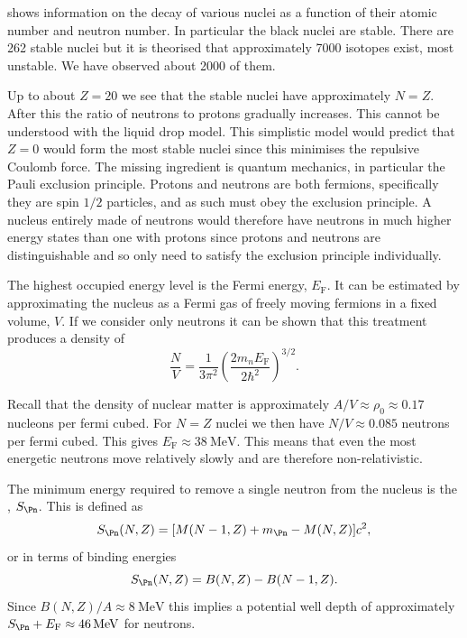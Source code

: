 \documentclass[fleqn]{NotesClass}
\newcommand{\fermiEnergy}{E_{\mathrm{F}}}
\begin{document}
     shows information on the decay of various nuclei as a function of their atomic number and neutron number.
    In particular the black nuclei are stable.
    There are 262 stable nuclei but it is theorised that approximately 7000 isotopes exist, most unstable.
    We have observed about 2000 of them.
    
    Up to about \(Z = 20\) we see that the stable nuclei have approximately \(N = Z\).
    After this the ratio of neutrons to protons gradually increases.
    This cannot be understood with the liquid drop model.
    This simplistic model would predict that \(Z = 0\) would form the most stable nuclei since this minimises the repulsive Coulomb force.
    The missing ingredient is quantum mechanics, in particular the Pauli exclusion principle.
    Protons and neutrons are both fermions, specifically they are spin \(1/2\) particles, and as such must obey the exclusion principle.
    A nucleus entirely made of neutrons would therefore have neutrons in much higher energy states than one with protons since protons and neutrons are distinguishable and so only need to satisfy the exclusion principle individually.
    
    The highest occupied energy level is the Fermi energy, \(\fermiEnergy\).
    It can be estimated by approximating the nucleus as a Fermi gas of freely moving fermions in a fixed volume, \(V\).
    If we consider only neutrons it can be shown that this treatment produces a density of
    \begin{equation}
        \frac{N}{V} = \frac{1}{3\pi^2} \left( \frac{2m_n\fermiEnergy}{2\hbar^2} \right)^{3/2}.
    \end{equation}
    
    Recall that the density of nuclear matter is approximately \(A/V \approx \rho_0 \approx 0.17\) nucleons per fermi cubed.
    For \(N = Z\) nuclei we then have \(N/V \approx 0.085\) neutrons per fermi cubed.
    This gives \(\fermiEnergy \approx \qty{38}{\MeV}\).
    This means that even the most energetic neutrons move relatively slowly and are therefore non-relativistic.
    
    The minimum energy required to remove a single neutron from the nucleus is the , \(S_\Pn\).
    This is defined as
    \begin{equation}
        S_{\Pn}(N, Z) = [M(N - 1, Z) + m_\Pn - M(N, Z)]c^2,
    \end{equation}
    or in terms of binding energies
    \begin{equation}
        S_{\Pn}(N, Z) = B(N, Z) - B(N - 1, Z).
    \end{equation}
    Since \(B(N, Z)/A \approx \qty{8}{\MeV}\) this implies a potential well depth of approximately \(S_\Pn + \fermiEnergy \approx \qty{46}{\MeV}\) for neutrons.
    
\end{document}
